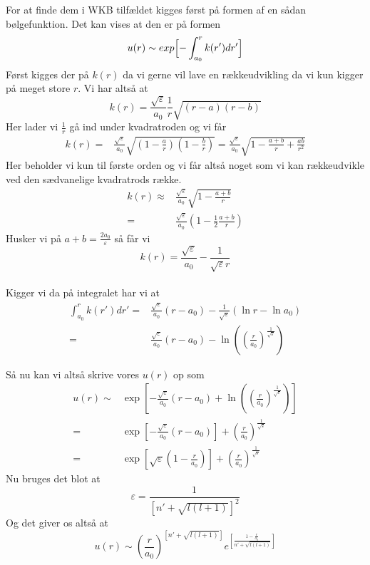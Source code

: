 For at finde dem i WKB tilfældet kigges først på formen af en sådan bølgefunktion. Det kan vises at den er på formen %
\begin{equation}
  u(r) \sim exp\Bigl[-\int_{a_0}^{r}k(r')dr'\Bigr]
\end{equation}
Først kigges der på $k(r)$ da vi gerne vil lave en rækkeudvikling da vi kun kigger på meget store $r$.
Vi har altså at
\begin{equation}
  k(r) = \frac{\sqrt{\varepsilon}}{a_0}\frac{1}{r}\sqrt{(r-a)(r-b)}
\end{equation}
Her lader vi $\frac{1}{r}$ gå ind under kvadratroden og vi får
\begin{align}
  k(r) = & \frac{\sqrt{\varepsilon}}{a_0}\sqrt{(1-\frac{a}{r})(1-\frac{b}{r})} = \frac{\sqrt{\varepsilon}}{a_0}\sqrt{1-\frac{a+b}{r}+\frac{ab}{r^2}}
\end{align}
Her beholder vi kun til første orden og vi får altså noget som vi kan rækkeudvikle ved den sædvanelige kvadratrods række.
\begin{align}
  k(r) \approx & \frac{\sqrt{\varepsilon}}{a_0}\sqrt{1-\frac{a+b}{r}}\\
       = & \frac{\sqrt{\varepsilon}}{a_0}(1-\frac{1}{2}\frac{a+b}{r})
\end{align}
Husker vi på $a+b = \frac{2a_0}{\varepsilon}$ så får vi
\begin{equation}
  k(r) = \frac{\sqrt{\varepsilon}}{a_0}-\frac{1}{\sqrt{\varepsilon}r}
\end{equation}
\\
Kigger vi da på integralet har vi at
\begin{align}
  \int_{a_0}^{r}k(r')dr' = & \frac{\sqrt{\varepsilon}}{a_0}(r-a_0) - \frac{1}{\sqrt{\varepsilon}}\left(\ln{r}-\ln{a_0}\right)\\
  = & \frac{\sqrt{\varepsilon}}{a_0}(r-a_0) - \ln{((\frac{r}{a_0})^{\frac{1}{\sqrt{\varepsilon}}})}
\end{align}

Så nu kan vi altså skrive vores $u(r)$ op som
\begin{align}
  u(r) \sim & \exp\left[-\frac{\sqrt{\varepsilon}}{a_0}(r-a_0) + \ln{((\frac{r}{a_0})^{\frac{1}{\sqrt{\varepsilon}}})}\right]\\
        = & \exp\left[-\frac{\sqrt{\varepsilon}}{a_0}(r-a_0)\right] + (\frac{r}{a_0})^{\frac{1}{\sqrt{\varepsilon}}}\\
        = & \exp\left[\sqrt{\varepsilon}(1-\frac{r}{a_0})\right] + (\frac{r}{a_0})^{\frac{1}{\sqrt{\varepsilon}}}
\end{align}
Nu bruges det blot at
\begin{equation}
  \varepsilon = \frac{1}{\left[n'+\sqrt{l(l+1)}\right]^2}
\end{equation}
Og det giver os altså at
\begin{equation}
  u(r) \sim {\left(\frac{r}{a_0}\right)}^{\left[n'+\sqrt{l(l+1)}\right]} e^{\left[\frac{1-\frac{r}{a_0}}{n'+\sqrt{l(l+1)}}\right]}
\end{equation}

